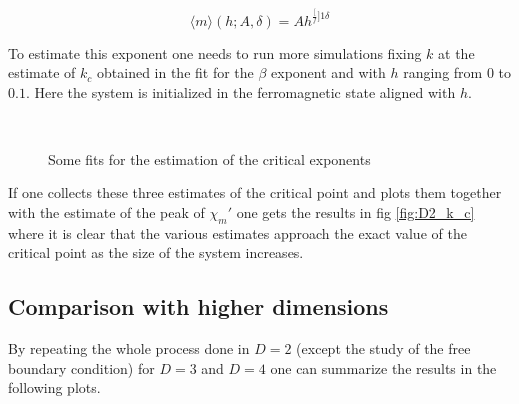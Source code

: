 \documentclass[a4paper, 11pt]{article}
\begin{document}
      \begin{equation}
        \langle m \rangle (h;A,\delta) = Ah^{\frac[f]{1}{\delta}}
      \end{equation}

      To estimate this exponent one needs to run more simulations fixing $k$ at the estimate of $k_c$ obtained in the fit for the $\beta$ exponent and with $h$ ranging from $0$ to $0.1$. Here the system is initialized in the ferromagnetic state aligned with $h$.

      \begin{figure}[H]
        \centering
        \begin{subfigure}[Fit of the specific heat: estimation of $\alpha_1$, $\alpha_2$.]{
          \label{fig:D2_alpha}}
        \end{subfigure}
        \begin{subfigure}[Fit of the magnetization with respect to $k$ at $h = 0$: estimation of $\beta$.]{
          \label{fig:D2_beta}}
        \end{subfigure}\\
        \begin{subfigure}[Fit of the magnetic susceptibility: estimation of $\gamma_1$, $\gamma_2$.]{
          \label{fig:D2_gamma}}
        \end{subfigure}
        \begin{subfigure}[Fit of the magnetization with respect to $h$ at $k = k_c$: estimation of $\delta$.]{
          \label{fig:D2_delta}}
        \end{subfigure}
        \caption{Some fits for the estimation of the critical exponents}
      \end{figure}

      If one collects these three estimates of the critical point and plots them together with the estimate of the peak of $\chi_m'$ one gets the results in fig \ref{fig:D2_k_c} where it is clear that the various estimates approach the exact value of the critical point as the size of the system increases.


    \subsection{Comparison with higher dimensions}
      By repeating the whole process done in $D=2$ (except the study of the free boundary condition) for $D = 3$ and $D = 4$ one can summarize the results in the following plots.
\end{document}
